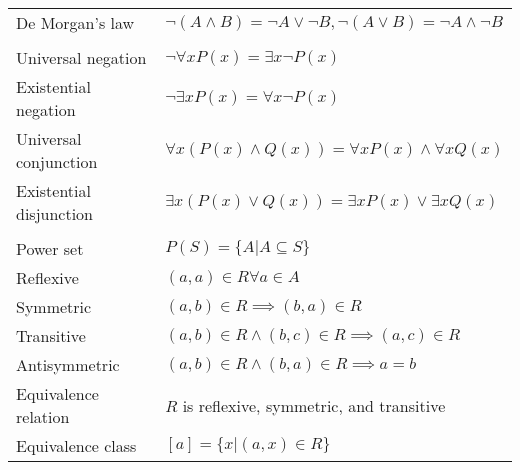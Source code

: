 \documentclass[a4paper,landscape]{article}
\begin{document}
\begin{multicols*}{2}
\begin{tabularx}{\columnwidth}{@{}lX@{}}
        De Morgan's law                            & $\neg (A \land B) = \neg A \lor \neg B, \neg (A \lor B) = \neg A \land \neg B$                                       \\
        \\
        Universal negation                         & $\neg \forall x P(x) = \exists x \neg P(x)$                                                                          \\
        Existential negation                       & $\neg \exists x P(x) = \forall x \neg P(x)$                                                                          \\
        Universal conjunction                      & $\forall x (P(x) \land Q(x)) = \forall x P(x) \land \forall x Q(x)$                                                  \\
        Existential disjunction                    & $ \exists x (P(x) \lor Q(x)) = \exists x P(x) \lor \exists x Q(x)$                                                   \\
        \\
        Power set                                  & $P(S) = \{A | A \subseteq S\}$                                                                                       \\
        Reflexive                                  & $(a,a) \in R \forall a \in A$                                                                                        \\
        Symmetric                                  & $(a,b) \in R \implies (b,a) \in R$                                                                                   \\
        Transitive                                 & $(a,b) \in R \land (b,c) \in R \implies (a,c) \in R$                                                                 \\
        Antisymmetric                              & $(a,b) \in R \land (b,a) \in R \implies a = b$                                                                       \\
        Equivalence relation                       & $R$ is reflexive, symmetric, and transitive                                                                          \\
        Equivalence class                          & $[a] = \{x | (a,x) \in R\}$                                                                                          \\

\end{tabularx}
\end{multicols*}
\end{document}
